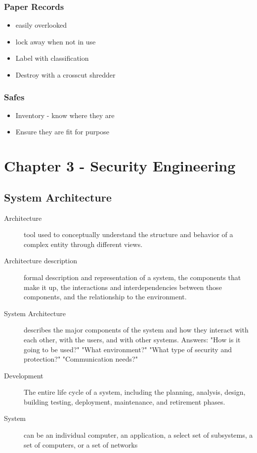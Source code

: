 \documentclass[11pt]{article}
\begin{document}
\subsubsection{Paper Records}
\label{sec:orgf09e53f}
\begin{itemize}
\item easily overlooked
\item lock away when not in use
\item Label with classification
\item Destroy with a crosscut shredder
\end{itemize}
\subsubsection{Safes}
\label{sec:org0482a7f}
\begin{itemize}
\item Inventory - know where they are
\item Ensure they are fit for purpose
\end{itemize}
\section{Chapter 3 - Security Engineering}
\label{sec:orga3ef2af}
\subsection{System Architecture}
\label{sec:org1becbe9}
\begin{description}
\item[{Architecture}] tool used to conceptually understand the structure and behavior of a complex entity through different views.
\item[{Architecture description}] formal description and representation of a system, the components that make it up, the interactions and interdependencies between those components, and the relationship to the environment.
\item[{System Architecture}] describes the major components of the system and how they interact with each other, with the users, and with other systems. Answers: "How is it going to be used?" "What environment?" "What type of security and protection?" "Communication needs?"
\item[{Development}] The entire life cycle of a system, including the planning, analysis, design, building testing, deployment, maintenance, and retirement phases.
\item[{System}] can be an individual computer, an application, a select set of subsystems, a set of computers, or a set of networks
\end{description}
\end{document}
